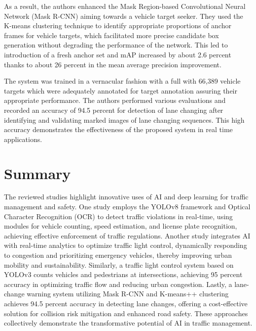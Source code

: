 As a result, the authors enhanced the Mask Region-based Convolutional Neural Network (Mask R-CNN) aiming towards a vehicle target seeker. They used the K-means clustering technique to identify appropriate proportions of anchor frames for vehicle targets, which facilitated more precise candidate box generation without degrading the performance of the network. This led to introduction of a fresh anchor set and mAP increased by about 2.6 percent thanks to about 26 percent in the mean average precision improvement.

The system was trained in a vernacular fashion with a full with 66,389 vehicle targets which were adequately annotated for target annotation assuring their appropriate performance. The authors performed various evaluations and recorded an accuracy of 94.5 percent for detection of lane changing after identifying and validating marked images of lane changing sequences. This high accuracy demonstrates the effectiveness of the proposed system in real time applications.


\newpage
\section{Summary}
The reviewed studies highlight innovative uses of AI and deep learning for traffic management and safety. One study employs the YOLOv8 framework and Optical Character Recognition (OCR) to detect traffic violations in real-time, using modules for vehicle counting, speed estimation, and license plate recognition, achieving effective enforcement of traffic regulations. Another study integrates AI with real-time analytics to optimize traffic light control, dynamically responding to congestion and prioritizing emergency vehicles, thereby improving urban mobility and sustainability. Similarly, a traffic light control system based on YOLOv3 counts vehicles and pedestrians at intersections, achieving 95 percent accuracy in optimizing traffic flow and reducing urban congestion. Lastly, a lane-change warning system utilizing Mask R-CNN and K-means++ clustering achieves 94.5 percent accuracy in detecting lane changes, offering a cost-effective solution for collision risk mitigation and enhanced road safety. These approaches collectively demonstrate the transformative potential of AI in traffic management.







